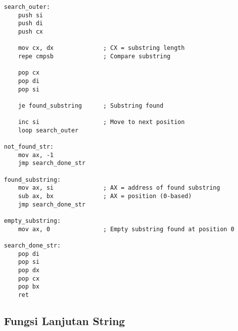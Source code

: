 \documentclass[../main.tex]{subfiles}
\begin{document}
\begin{lstlisting}[language={[x86masm]Assembler}, caption=Mencari Karakter dalam String, label={lst:string-search}]
search_outer:
    push si
    push di
    push cx
    
    mov cx, dx              ; CX = substring length
    repe cmpsb              ; Compare substring
    
    pop cx
    pop di
    pop si
    
    je found_substring      ; Substring found
    
    inc si                  ; Move to next position
    loop search_outer
    
not_found_str:
    mov ax, -1
    jmp search_done_str
    
found_substring:
    mov ax, si              ; AX = address of found substring
    sub ax, bx              ; AX = position (0-based)
    jmp search_done_str
    
empty_substring:
    mov ax, 0               ; Empty substring found at position 0
    
search_done_str:
    pop di
    pop si
    pop dx
    pop cx
    pop bx
    ret
                \end{lstlisting}

        \subsection{Fungsi Lanjutan String}
\end{document}
